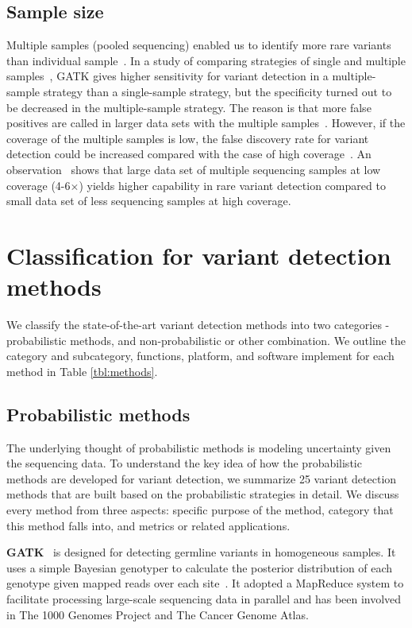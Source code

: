 \documentclass[a4,center,fleqn]{NAR}
\begin{document}
\subsection{Sample size}

Multiple samples (pooled sequencing) enabled us to identify more rare variants than individual sample~\citep{Bao2014, liu2012steps}.
In a study of comparing strategies of single and multiple samples~\citep{liu2013variant}, GATK gives higher sensitivity for variant detection in a multiple-sample strategy than a single-sample strategy, but the specificity turned out to be decreased in the multiple-sample strategy.
The reason is that more false positives are called in larger data sets with the multiple samples~\citep{Nielsen2011}.
However, if the coverage of the multiple samples is low, the false discovery rate for variant detection could be increased compared with the case of high coverage~\citep{Cheng2014}.
An observation~\citep{le2011snp} shows that large data set of multiple sequencing samples at low coverage (4-6$\times$) yields higher capability in rare variant detection compared to small data set of less sequencing samples at high coverage.


\section{Classification for variant detection methods}

We classify the state-of-the-art variant detection methods into two categories - probabilistic methods, and non-probabilistic or other combination.
We outline the category and subcategory, functions, platform, and software implement for each method in Table \ref{tbl:methods}.



\subsection{Probabilistic methods}

The underlying thought of probabilistic methods is modeling uncertainty given the sequencing data.
To understand the key idea of how the probabilistic methods are developed for variant detection, we summarize 25 variant detection methods that are built based on the probabilistic strategies in detail.
We discuss every method from three aspects: specific purpose of the method, category that this method falls into, and metrics or related applications.

\textbf{GATK}~\citep{McKenna2010} is designed for detecting germline variants in homogeneous samples.
It uses a simple Bayesian genotyper to calculate the posterior distribution of each genotype given mapped reads over each site~\citep{depristo2011framework}.
It adopted a MapReduce system to facilitate processing large-scale sequencing data in parallel and has been involved in The 1000 Genomes Project and The Cancer Genome Atlas.
\end{document}
